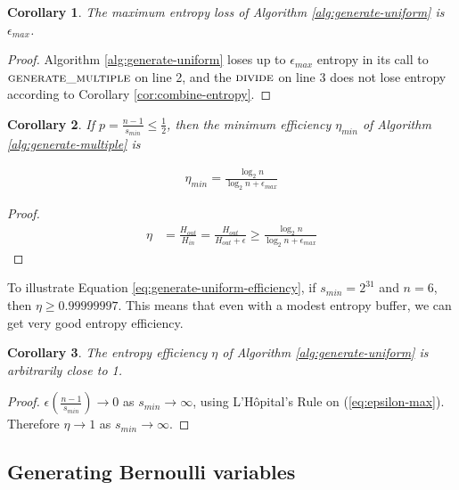 \documentclass[12pt]{article}
\newtheorem{corollary}{Corollary}
\begin{document}
\begin{corollary}
    The maximum entropy loss of Algorithm \ref{alg:generate-uniform} is $\epsilon_{max}$.
\end{corollary}

\begin{proof}
    Algorithm \ref{alg:generate-uniform} loses up to $\epsilon_{max}$ entropy in its call to $\textsc{generate\_multiple}$ on line 2, and the $\textsc{divide}$ on line 3 does not lose entropy according to Corollary \ref{cor:combine-entropy}.
\end{proof}

\begin{corollary}
    If $p = \frac{n-1}{s_{min}} \le \frac{1}{2}$, then the minimum efficiency $\eta_{min}$ of Algorithm \ref{alg:generate-multiple} is 

\begin{align}
    \label{eq:generate-uniform-efficiency}
    \eta_{min} = \frac{\log_2n}{\log_2n + \epsilon_{max}}
\end{align}
\end{corollary}

\begin{proof}
\begin{align}
    \eta & = \frac{H_{out}}{H_{in}}
          = \frac{H_{out}}{H_{out}+\epsilon} 
          \ge \frac{\log_2n}{\log_2n + \epsilon_{max}}
\end{align}
\end{proof}

To illustrate Equation \ref{eq:generate-uniform-efficiency}, if $s_{min}=2^{31}$ and $n=6$, then $\eta \ge 0.99999997$. This means that even with a modest entropy buffer, we can get very good entropy efficiency.

\begin{corollary}
The entropy efficiency $\eta$ of Algorithm \ref{alg:generate-uniform} is arbitrarily close to 1.
\end{corollary}

\begin{proof}
$\epsilon(\frac{n-1}{s_{min}}) \rightarrow 0$ as $s_{min} \rightarrow \infty$, using L'H\^opital's Rule on (\ref{eq:epsilon-max}). Therefore $\eta \rightarrow 1$ as $s_{min} \rightarrow \infty$.
\end{proof}



\subsection{Generating Bernoulli variables}
\end{document}
